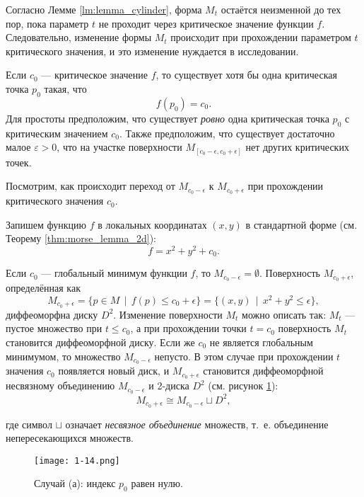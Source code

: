 \documentclass[a4paper,12pt,openany,leqno]{extbook}
\begin{document}
Согласно Лемме \ref{lm:lemma_cylinder}, форма $M_t$ остаётся неизменной до тех пор, пока параметр $t$ не проходит через критическое значение функции $f$. Следовательно, изменение формы $M_t$ происходит при прохождении параметром $t$ критического значения, и это изменение нуждается в исследовании.

Если $c_0$ --- критическое значение $f$, то существует хотя бы одна критическая точка $p_0$ такая, что
\[ f(p_0) = c_0. \]
Для простоты предположим, что существует \emph{ровно} одна критическая точка $p_0$ с критическим значением $c_0$. Также предположим, что существует достаточно малое $\varepsilon > 0$, что на участке поверхности $M_{[c_0 - \epsilon, c_0 + \epsilon]}$ нет других критических точек.

Посмотрим, как происходит переход от $M_{c_0 - \epsilon}$ к $M_{c_0 + \epsilon}$ при прохождении критического значения $c_0$.


Запишем функцию $f$ в локальных координатах $(x, y)$ в стандартной форме (см. Теорему \ref{thm:morse_lemma_2d}):
\begin{equation}
f = x^2 + y^2 + c_0.
\end{equation}

Если $c_0$ --- глобальный минимум функции $f$, то $M_{c_0 - \epsilon} = \emptyset$. Поверхность $M_{c_0 + \epsilon}$, определённая как
\begin{equation}
M_{c_0 + \epsilon} = \{ p \in M\,\mid\,f(p) \leq c_0 + \epsilon \} = \{(x, y)\,\mid\,x^2 + y^2 \leq \epsilon\},
\end{equation}
диффеоморфна диску $D^2$. Изменение поверхности $M_t$ можно описать так: $M_t$ --- пустое множество при $t \leq c_0$, а при прохождении точки $t = c_0$ поверхность $M_t$ становится диффеоморфной диску. Если же $c_0$ не является глобальным минимумом, то множество $M_{c_0 - \epsilon}$ непусто. В этом случае при прохождении $t$ значения $c_0$ появляется новый диск, и $M_{c_0 + \epsilon}$ становится диффеоморфной несвязному объединению $M_{c_0 - \epsilon}$ и 2-диска $D^2$ (см. рисунок \ref{fig:p0_index_zero}):
\begin{equation}
M_{c_0 + \epsilon} \cong M_{c_0 - \epsilon} \sqcup D^2,
\end{equation}

где символ $\sqcup$ означает \emph{несвязное объединение} множеств, т.~е. объединение непересекающихся множеств.

\begin{figure}[ht]
\texttt{[image: 1-14.png]}
\caption{Случай (а): индекс $p_0$ равен нулю.}
\label{fig:p0_index_zero}
\end{figure}
\end{document}
